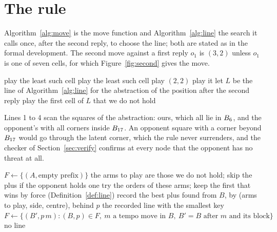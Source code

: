 \documentclass[11pt]{amsart}
\theoremstyle{definition}
\theoremstyle{remark}
\begin{document}
\section{The rule}\label{sec:rule}

Algorithm~\ref{alg:move} is the move function and
Algorithm~\ref{alg:line} the search it calls once, after the second
reply, to choose the line; both are stated as in the formal
development. The second move against a first reply $o_1$ is $(3,2)$
unless $o_1$ is one of seven cells, for which Figure~\ref{fig:second}
gives the move.

\begin{algorithm}[ht]
\caption{The move function.}\label{alg:move}
\begin{algorithmic}[1]
  \State play the least such cell
  \State play the least such cell
  \State play $(2,2)$
  \State play it
\Else
  \State let $L$ be the line of Algorithm~\ref{alg:line} for the
    abstraction of the position after the second reply
  \State play the first cell of $L$ that we do not hold
\EndIf
\end{algorithmic}
\end{algorithm}

Lines 1 to 4 scan the squares of the abstraction: ours, which all lie
in $B_6$, and the opponent's with all corners inside
$B_{17}$. An opponent square with a corner beyond $B_{17}$
would go through the latent corner, which the rule never surrenders,
and the checker of Section~\ref{sec:verify} confirms at every node
that the opponent has no threat at all.

\begin{algorithm}[ht]
\caption{The line search, from an abstract position $A$.}\label{alg:line}
\begin{algorithmic}[1]
\State $F \gets \{(A, \text{empty prefix})\}$
      \State the arms to play are those we do not hold; skip the plus if the opponent holds one
      \State try the orders of these arms; keep the first that wins by force (Definition~\ref{def:line})
    \EndFor
    \State record the best plus found from $B$, by (arms to play, side, centre), behind $p$
  \EndFor
   \Return the recorded line with the smallest key \EndIf
  \State $F \gets \{(B', p\,m) : (B, p) \in F,\ m \text{ a tempo move in } B,\ B' = B \text{ after } m \text{ and its block}\}$
\EndFor
\State \Return no line
\end{algorithmic}
\end{algorithm}
\end{document}
